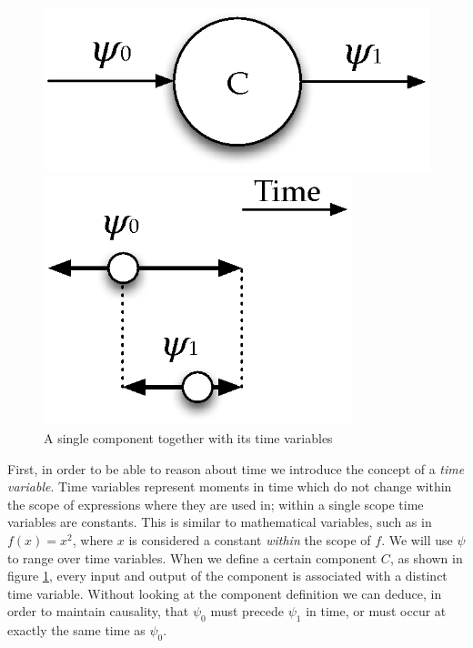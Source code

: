 \begin{figure}[h]
\begin{minipage}{0.45\textwidth}
\centering
\includegraphics[width=\textwidth]{images/comp}
\end{minipage}
\begin{minipage}{0.45\textwidth}
\centering
\includegraphics[width=0.8\textwidth]{images/constraintsingle}
\end{minipage}
\caption{A single component together with its time variables} \label{fig:singlecomp}
\end{figure}

First, in order to be able to reason about time we introduce the concept of a \textit{time variable}. 
Time variables represent moments in time which do not change within the scope of expressions where they are used in; within a single scope time variables are constants.
This is similar to mathematical variables, such as in $f(x) = x^2$, where $x$ is considered a constant \textit{within} the scope of $f$.
We will use $\psi$ to range over time variables.
When we define a certain component $C$, as shown in figure \ref{fig:singlecomp}, every input and output of the component is associated with a distinct time variable.
Without looking at the component definition we can deduce, in order to maintain causality, that $\psi_0$ must precede $\psi_1$ in time, or must occur at exactly the same time as $\psi_0$.

